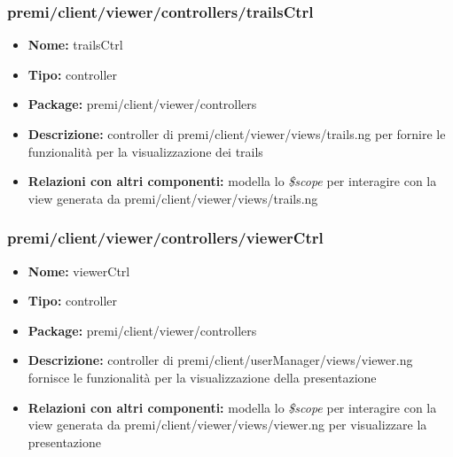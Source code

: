 \subsubsection{premi/client/viewer/controllers/trailsCtrl}
\begin{itemize}
  \item[] \textbf{Nome:} trailsCtrl
  \item[] \textbf{Tipo:} controller
  \item[] \textbf{Package:} premi/client/viewer/controllers
  \item[] \textbf{Descrizione:} controller di premi/client/viewer/views/trails.ng per fornire le funzionalità per la visualizzazione dei trails
  \item[] \textbf{Relazioni con altri componenti:} modella lo \textit{\$scope} per interagire con la view generata da premi/client/viewer/views/trails.ng
\end{itemize}
\subsubsection{premi/client/viewer/controllers/viewerCtrl}
\begin{itemize}
  \item[] \textbf{Nome:} viewerCtrl
  \item[] \textbf{Tipo:} controller
  \item[] \textbf{Package:} premi/client/viewer/controllers
  \item[] \textbf{Descrizione:} controller di premi/client/userManager/views/viewer.ng fornisce le funzionalità per la visualizzazione della presentazione
  \item[] \textbf{Relazioni con altri componenti:} modella lo \textit{\$scope} per interagire con la view generata da premi/client/viewer/views/viewer.ng per visualizzare la presentazione
\end{itemize}

















